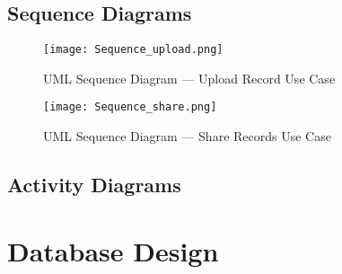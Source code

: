 \FloatBarrier{}
\clearpage

\subsection{Sequence Diagrams}
\begin{figure}[htbp]
    \centering
    \texttt{[image: Sequence\_upload.png]}
    \caption{UML Sequence Diagram --- Upload Record Use Case}\label{fig:sequence1}
\end{figure}

\begin{figure}[htbp]
    \centering
    \texttt{[image: Sequence\_share.png]}
    \caption{UML Sequence Diagram --- Share Records Use Case}\label{fig:sequence2}
\end{figure}

\FloatBarrier{}

\noindent\begin{minipage}{\textwidth}
    \subsection{Activity Diagrams}
    \begin{center}
        \label{fig:activity1}
    \end{center}
\end{minipage}

\noindent\begin{minipage}{\textwidth}
    \begin{center}
        \label{fig:activity2}
    \end{center}
\end{minipage}

\FloatBarrier{}

\noindent\begin{minipage}{\textwidth}
    \section{Database Design}
    \begin{center}
        \label{fig:erd}
    \end{center}
\end{minipage}

